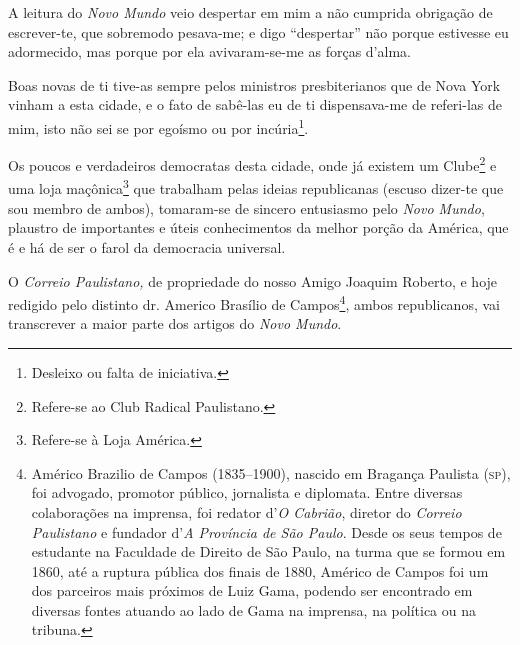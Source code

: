 A leitura do \emph{Novo Mundo} veio despertar em mim a não cumprida
obrigação de escrever-te, que sobremodo pesava-me; e digo ``despertar''
não porque estivesse eu adormecido, mas porque por ela avivaram-se-me as
forças d'alma.

Boas novas de ti tive-as sempre pelos ministros presbiterianos que de
Nova York vinham a esta cidade, e o fato de sabê-las eu de ti
dispensava-me de referi-las de mim, isto não sei se por egoísmo ou por
incúria\footnote{ Desleixo ou falta de iniciativa.}.

Os poucos e verdadeiros democratas desta cidade, onde já existem um
Clube\footnote{ Refere-se ao Club Radical Paulistano.} e uma loja
maçônica\footnote{ Refere-se à Loja América.} que trabalham pelas
ideias republicanas (escuso dizer-te que sou membro de ambos),
tomaram-se de sincero entusiasmo pelo \emph{Novo Mundo}, plaustro de
importantes e úteis conhecimentos da melhor porção da América, que é e
há de ser o farol da democracia universal.

O \emph{Correio Paulistano,} de propriedade do nosso Amigo Joaquim
Roberto, e hoje redigido pelo distinto dr. Americo Brasílio de
Campos\footnote{ Américo Brazilio de Campos (1835--1900), nascido em
  Bragança Paulista (\textsc{sp}), foi advogado, promotor público, jornalista e
  diplomata. Entre diversas colaborações na imprensa, foi redator
  d'\emph{O Cabrião}, diretor do \emph{Correio Paulistano} e fundador
  d'\emph{A Província de São Paulo}. Desde os seus tempos de estudante
  na Faculdade de Direito de São Paulo, na turma que se formou em 1860,
  até a ruptura pública dos finais de 1880, Américo de Campos foi um dos
  parceiros mais próximos de Luiz Gama, podendo ser encontrado em
  diversas fontes atuando ao lado de Gama na imprensa, na política ou na
  tribuna.}, ambos republicanos, vai transcrever a maior parte dos
artigos do \emph{Novo Mundo}.

